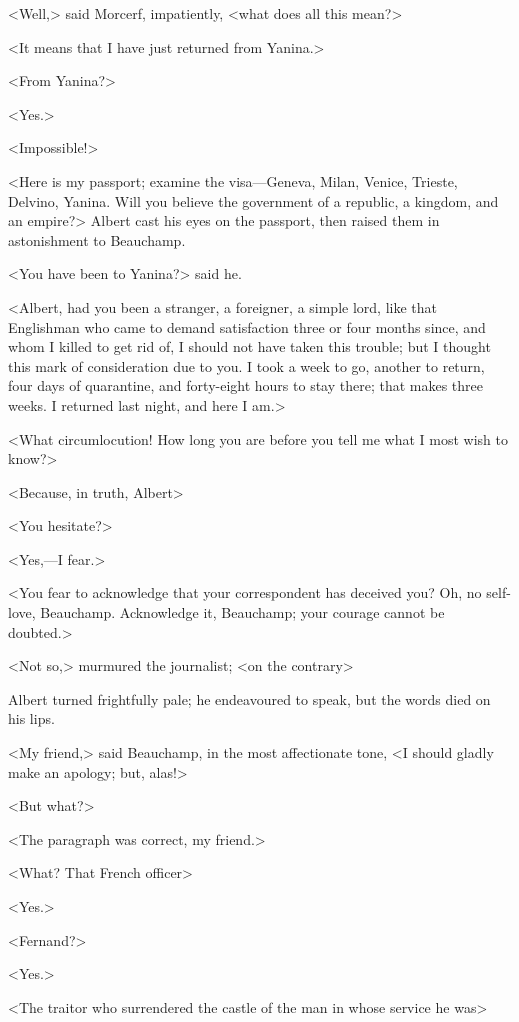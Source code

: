  <Well,> said Morcerf, impatiently, <what does all this mean?> 

 <It means that I have just returned from Yanina.> 

 <From Yanina?> 

 <Yes.> 

 <Impossible!> 

 <Here is my passport; examine the visa—Geneva, Milan, Venice, Trieste, Delvino, Yanina. Will you believe the government of a republic, a kingdom, and an empire?> Albert cast his eyes on the passport, then raised them in astonishment to Beauchamp. 

 <You have been to Yanina?> said he. 

 <Albert, had you been a stranger, a foreigner, a simple lord, like that Englishman who came to demand satisfaction three or four months since, and whom I killed to get rid of, I should not have taken this trouble; but I thought this mark of consideration due to you. I took a week to go, another to return, four days of quarantine, and forty-eight hours to stay there; that makes three weeks. I returned last night, and here I am.> 

 <What circumlocution! How long you are before you tell me what I most wish to know?> 

 <Because, in truth, Albert\longdash> 

 <You hesitate?> 

 <Yes,—I fear.> 

 <You fear to acknowledge that your correspondent has deceived you? Oh, no self-love, Beauchamp. Acknowledge it, Beauchamp; your courage cannot be doubted.> 

 <Not so,> murmured the journalist; <on the contrary\longdash> 

 Albert turned frightfully pale; he endeavoured to speak, but the words died on his lips. 

 <My friend,> said Beauchamp, in the most affectionate tone, <I should gladly make an apology; but, alas!\longdash> 

 <But what?> 

 <The paragraph was correct, my friend.> 

 <What? That French officer\longdash> 

 <Yes.> 

 <Fernand?> 

 <Yes.> 

 <The traitor who surrendered the castle of the man in whose service he was\longdash> 

